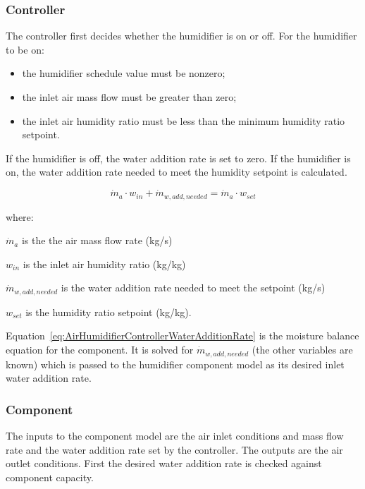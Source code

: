 \subsubsection{Controller}\label{controller}

The controller first decides whether the humidifier is on or off. For the humidifier to be on:

\begin{itemize}
\item the humidifier schedule value must be nonzero;
\item the inlet air mass flow must be greater than zero;
\item the inlet air humidity ratio must be less than the minimum humidity ratio setpoint.
\end{itemize}

If the humidifier is off, the water addition rate is set to zero. If the humidifier is on, the water addition rate needed to meet the humidity setpoint is calculated.

\begin{equation}
{\dot m_a} \cdot {w_{in}} + {\dot m_{w,add,needed}} = {\dot m_a} \cdot {w_{set}}
\label{eq:AirHumidifierControllerWaterAdditionRate}
\end{equation}

where:

\({\dot m_a}\) is the the air mass flow rate (kg/s)

\({w_{in}}\) is the inlet air humidity ratio (kg/kg)

\({\dot m_{w,add,needed}}\) is the water addition rate needed to meet the setpoint (kg/s)

\({w_{set}}\) is the humidity ratio setpoint (kg/kg).

Equation~\ref{eq:AirHumidifierControllerWaterAdditionRate} is the moisture balance equation for the component. It is solved for \({\dot m_{w,add,needed}}\) (the other variables are known) which is passed to the humidifier component model as its desired inlet water addition rate.

\subsubsection{Component}\label{component}

The inputs to the component model are the air inlet conditions and mass flow rate and the water addition rate set by the controller. The outputs are the air outlet conditions. First the desired water addition rate is checked against component capacity.

